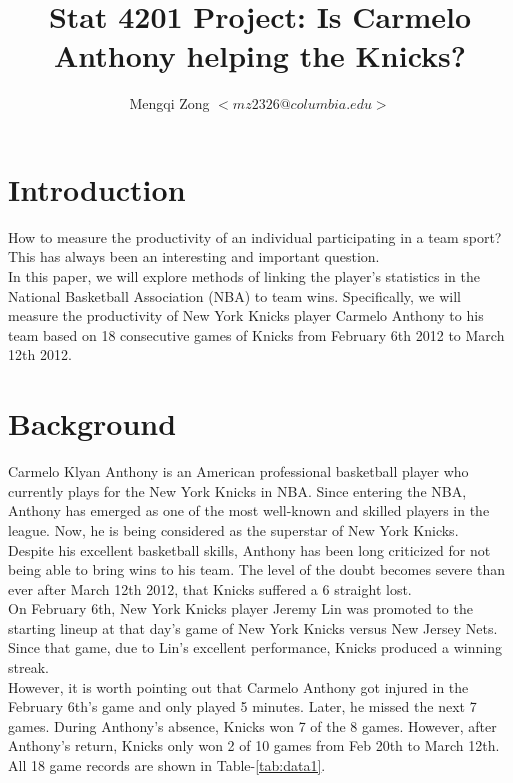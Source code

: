 \documentclass[12pt]{article}
\title{Stat 4201 Project: Is Carmelo Anthony helping the Knicks?}
\author{Mengqi Zong $<mz2326@columbia.edu>$}
\begin{document}
\maketitle


\section{Introduction}

How to measure the productivity of an individual participating in a
team sport? This has always been an interesting and important
question. \\

In this paper, we will explore methods of linking the player's
statistics in the National Basketball Association (NBA) to team
wins. Specifically, we will measure the productivity of New York 
Knicks player Carmelo Anthony to his team based on 18 consecutive
games of Knicks from February 6th 2012 to March 12th 2012.

\section{Background}

Carmelo Klyan Anthony is an American professional basketball player
who currently plays for the New York Knicks in NBA. Since entering the
NBA, Anthony has emerged as one of the most well-known and skilled
players in the league. Now, he is being considered as the superstar
of New York Knicks. \\

Despite his excellent basketball skills, Anthony has been long
criticized for not being able to bring wins to his team. The level of
the doubt becomes severe than ever after March 12th 2012, that Knicks
suffered a 6 straight lost. \\

On February 6th, New York Knicks player Jeremy Lin was promoted to the
starting lineup at that day's game of New York Knicks versus New
Jersey Nets. Since that game, due to Lin's excellent performance,
Knicks produced a winning streak. \\

However, it is worth pointing out that Carmelo Anthony got injured in
the February 6th's game and only played 5 minutes. Later, he missed
the next 7 games. During Anthony's absence, Knicks won 7 of the 8
games. However, after Anthony's return, Knicks only won 2 of 10 games
from Feb 20th to March 12th. All 18 game records are shown in
Table-\ref{tab:data1}.
\end{document}
